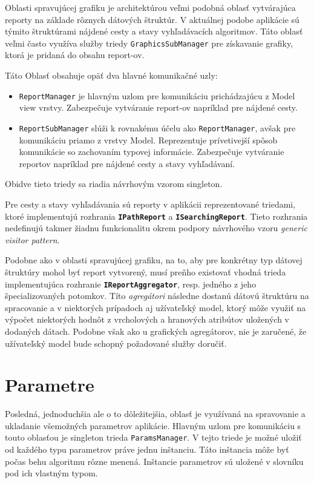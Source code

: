 Oblasti spravujúcej grafiku je architektúrou veľmi podobná oblasť vytvárajúca reporty na základe rôznych dátových štruktúr. V aktuálnej podobe aplikácie sú týmito štruktúrami nájdené cesty a stavy vyhľadávacích algoritmov. Táto oblasť veľmi často využíva služby triedy \texttt{GraphicsSubManager} pre získavanie grafiky, ktorá je pridaná do obsahu report-ov.

Táto Oblasť obsahuje opäť dva hlavné komunikačné uzly:
\begin{itemize}
    \item \texttt{ReportManager} je hlavným uzlom pre komunikáciu prichádzajúcu z Model view vrstvy. Zabezpečuje vytváranie report-ov napríklad pre nájdené cesty.
    \item \texttt{ReportSubManager} slúži k rovnakému účelu ako \texttt{ReportManager}, avšak pre komunikáciu priamo z vrstvy Model. Reprezentuje prívetivejší spôsob komunikácie so zachovaním typovej informácie. Zabezpečuje vytváranie reportov napríklad pre nájdené cesty a stavy vyhľadávaní.
\end{itemize}
Obidve tieto triedy sa riadia návrhovým vzorom singleton.

\bigskip

Pre cesty a stavy vyhľadávania sú reporty v aplikácii reprezentované triedami, ktoré implementujú rozhrania \textbf{\texttt{IPathReport}} a \textbf{\texttt{ISearchingReport}}. Tieto rozhrania nedefinujú takmer žiadnu funkcionalitu okrem podpory návrhového vzoru \textit{generic visitor pattern}.

Podobne ako v oblasti spravujúcej grafiku, na to, aby pre konkrétny typ dátovej štruktúry mohol byť report vytvorený, musí preňho existovať vhodná trieda implementujúca rozhranie \textbf{\texttt{IReportAggregator}}, resp. jedného z jeho špecializovaných potomkov. Títo \textit{agregátori} následne dostanú dátovú štruktúru na spracovanie a v niektorých prípadoch aj užívateľský model, ktorý môže využiť na výpočet niektorých hodnôt z vrcholových a hranových atribútov uložených v dodaných dátach. Podobne však ako u grafických agregátorov, nie je zaručené, že užívateľský model bude schopný požadované služby doručiť. 

\section{Parametre}

Posledná, jednoduchšia ale o to dôležitejšia, oblasť je využívaná na spravovanie a ukladanie všemožných parametrov aplikácie. Hlavným uzlom pre komunikáciu s touto oblasťou je singleton trieda \texttt{ParamsManager}. V tejto triede je možné uložiť od každého typu parametrov práve jednu inštanciu. Táto inštancia môže byť počas behu algoritmu rôzne menená. Inštancie parametrov sú uložené v slovníku pod ich vlastným typom.  

